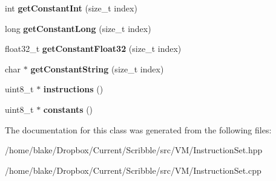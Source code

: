 \begin{DoxyCompactItemize}
\item 
\hypertarget{class_v_m_1_1_instruction_set_a270ddf1df2370a0ae5ae5d2c82a97dea}{int {\bfseries get\-Constant\-Int} (size\-\_\-t index)}\label{class_v_m_1_1_instruction_set_a270ddf1df2370a0ae5ae5d2c82a97dea}

\item 
\hypertarget{class_v_m_1_1_instruction_set_a0f2b7bd3d04346c3c4775b8a1b4e17f7}{long {\bfseries get\-Constant\-Long} (size\-\_\-t index)}\label{class_v_m_1_1_instruction_set_a0f2b7bd3d04346c3c4775b8a1b4e17f7}

\item 
\hypertarget{class_v_m_1_1_instruction_set_aee27dbf63468869fe15259a9c4529de1}{float32\-\_\-t {\bfseries get\-Constant\-Float32} (size\-\_\-t index)}\label{class_v_m_1_1_instruction_set_aee27dbf63468869fe15259a9c4529de1}

\item 
\hypertarget{class_v_m_1_1_instruction_set_a1ab7146f65458110c9478b6af855551e}{char $\ast$ {\bfseries get\-Constant\-String} (size\-\_\-t index)}\label{class_v_m_1_1_instruction_set_a1ab7146f65458110c9478b6af855551e}

\item 
\hypertarget{class_v_m_1_1_instruction_set_a708ef53450099fae3f61d1a1c3602a45}{uint8\-\_\-t $\ast$ {\bfseries instructions} ()}\label{class_v_m_1_1_instruction_set_a708ef53450099fae3f61d1a1c3602a45}

\item 
\hypertarget{class_v_m_1_1_instruction_set_abda042ab822309d8dab88606c3cf7e78}{uint8\-\_\-t $\ast$ {\bfseries constants} ()}\label{class_v_m_1_1_instruction_set_abda042ab822309d8dab88606c3cf7e78}

\end{DoxyCompactItemize}


The documentation for this class was generated from the following files\-:\begin{DoxyCompactItemize}
\item 
/home/blake/\-Dropbox/\-Current/\-Scribble/src/\-V\-M/Instruction\-Set.\-hpp\item 
/home/blake/\-Dropbox/\-Current/\-Scribble/src/\-V\-M/Instruction\-Set.\-cpp\end{DoxyCompactItemize}
